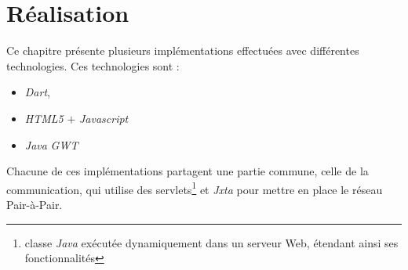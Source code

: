 \chapter{Réalisation}
  Ce chapitre présente plusieurs implémentations effectuées avec différentes
  technologies. Ces technologies sont :
  \begin{itemize}
    \item \emph{Dart},
    \item \emph{HTML5} $+$ \emph{Javascript}
    \item \emph{Java} \emph{GWT}
  \end{itemize}
  Chacune de ces implémentations partagent une partie commune, celle de la
  communication, qui utilise des servlets\footnote{classe \emph{Java} exécutée
  dynamiquement dans un serveur Web, étendant ainsi ses fonctionnalités} et
  \emph{Jxta} pour mettre en place le réseau Pair-à-Pair.

  

  

  
  
  

